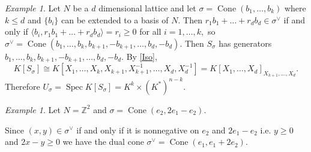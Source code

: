 \documentclass[BSc]{usydthesis}
\numberwithin{equation}{chapter}
\theoremstyle{remark}
\newtheorem{Example}[equation]{Example}
\newcommand{\Z}{\mathbb{Z}}
\newcommand{\V}{\vee}
\DeclareMathOperator{\Cone}{Cone}
\DeclareMathOperator{\Spec}{Spec}
\begin{document}
\begin{Example} \label{smoothbase}
 Let $N$ be a $d$ dimensional lattice and let $\sigma = \Cone(b_1,\ldots, b_k)$ where $k\leq d$ and $\{b_i\}$ can be extended to a basis of $N.$ Then $r_1 b_1 + \ldots + r_d b_d \in \sigma^{\V}$ if and only if $\langle b_i , r_1 b_1 + \ldots + r_d b_d \rangle= r_i \geq 0 $ for all $i=1,\ldots, k,$ so $\sigma^{\V} = \Cone(b_1, \ldots, b_k, b_{k+1}, -b_{k+1}, \ldots, b_d, -b_d).$ Then $S_{\sigma}$ has generators $ b_1, \ldots, b_k,   b_{k+1}, -b_{k+1}, \ldots, b_d, -b_d.$ By \ref{Iso}, $$K[S_{\sigma}] \cong K[X_1, \ldots, X_k, X_{k+1}, X_{k+1}^{-1}, \ldots, X_d, X_d^{-1}]= K[X_1,\ldots, X_d]_{X_{k+1}, \ldots, X_d}.$$ Therefore $U_{\sigma} = \Spec K[S_{\sigma}] = K^k \times (K^*)^{n-k}.$
\end{Example}

\begin{Example} \label{EllipticalCone}
 Let $N=\Z^2$ and $\sigma = \Cone(e_2, 2e_1 - e_2).$

\begin{figure}[ht]
  \centering
  \label{figure:lattice2}
\end{figure}

Since $(x,y)\in \sigma^{\V}$ if and only if it is nonnegative on $e_2$ and $2e_1 - e_2$ i.e. $y\geq 0$ and $2x-y\geq 0$ we have the dual cone $\sigma^{\V} = \Cone(e_1, e_1+2e_2).$


\end{Example}
\end{document}
